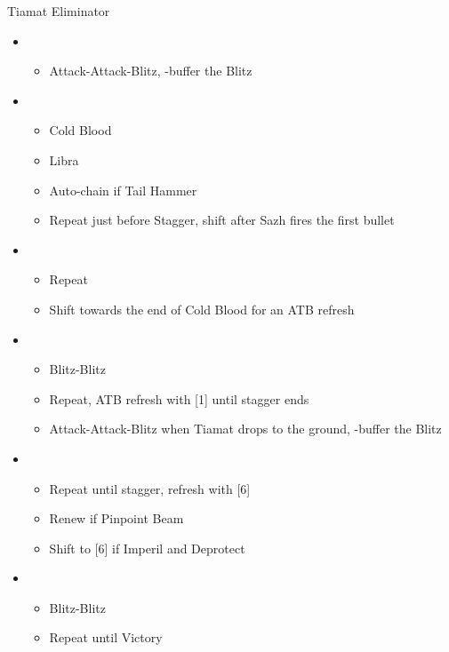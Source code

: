 \begin{battle}{Tiamat Eliminator}
\begin{itemize}
    \item \fourth
    \begin{itemize}
        \item Attack-Attack-Blitz, \rav-buffer the Blitz
    \end{itemize}
    \item \sixth
    \begin{itemize}
        \item Cold Blood
        \item Libra
        \item Auto-chain if Tail Hammer
        \item Repeat just before Stagger, shift after Sazh fires the first bullet
    \end{itemize}
    \item \third
    \begin{itemize}
        \item Repeat
        \item Shift towards the end of Cold Blood for an ATB refresh
    \end{itemize}
    \item \second
    \begin{itemize}
        \item Blitz-Blitz
        \item Repeat, ATB refresh with [1] until stagger ends
        \item Attack-Attack-Blitz when Tiamat drops to the ground, \rav-buffer the Blitz
    \end{itemize}
    \item \fifth
    \begin{itemize}
        \item Repeat until stagger, refresh with [6]
        \item Renew if Pinpoint Beam
        \item Shift to [6] if Imperil and Deprotect
    \end{itemize}
    \item \second
    \begin{itemize}
        \item Blitz-Blitz
        \item Repeat until Victory
    \end{itemize}
\end{itemize}
\end{battle}

